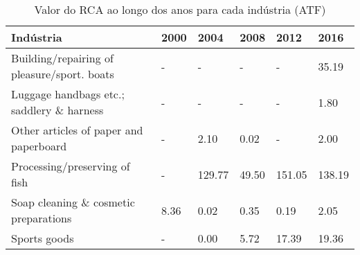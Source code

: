 \begin{table}
\centering
\caption{Valor do RCA ao longo dos anos para cada indústria (ATF)}
\label{tab:ex3-tempo-ATF}
\begin{tabular}{p{6cm}p{1.5cm}p{1.5cm}p{1.5cm}p{1.5cm}p{1.5cm}}
\toprule
                                  Indústria & 2000 &   2004 &  2008 &   2012 &   2016 \\
\midrule
Building/repairing of pleasure/sport. boats &    - &      - &     - &      - &  35.19 \\
  Luggage handbags etc.; saddlery \& harness &    - &      - &     - &      - &   1.80 \\
     Other articles of paper and paperboard &    - &   2.10 &  0.02 &      - &   2.00 \\
              Processing/preserving of fish &    - & 129.77 & 49.50 & 151.05 & 138.19 \\
      Soap cleaning \& cosmetic preparations & 8.36 &   0.02 &  0.35 &   0.19 &   2.05 \\
                               Sports goods &    - &   0.00 &  5.72 &  17.39 &  19.36 \\
\bottomrule
\end{tabular}
\end{table}
